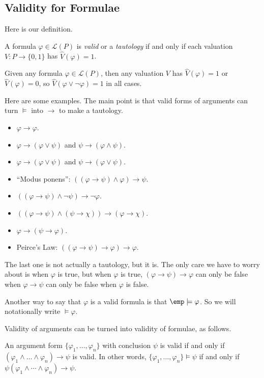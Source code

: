 \subsection{Validity for Formulae}
Here is our definition.
\begin{definition}
	A formula $\varphi\in\mathcal L(P)$ is \textit{valid} or a \textit{tautology} if and only if each valuation $V:P\to\{0,1\}$ has $\hat V(\varphi)=1$.
\end{definition}
\begin{example}
	Given any formula $\varphi\in\mathcal L(P)$, then any valuation $V$ has $\hat V(\varphi)=1$ or $\hat V(\varphi)=0$, so $\hat V(\varphi\lor\lnot\varphi)=1$ in all cases.
\end{example}
Here are some examples. The main point is that valid forms of arguments can turn $\models$ into $\to$ to make a tautology.
\begin{itemize}
	\item $\varphi\to\varphi$.
	\item $\varphi\to(\varphi\lor\psi)$ and $\psi\to(\varphi\land\psi)$.
	\item $\varphi\to(\varphi\lor\psi)$ and $\psi\to(\varphi\lor\psi)$.
	\item ``Modus ponens'': $((\varphi\to\psi)\land\varphi)\to\psi$.
	\item $((\varphi\to\psi)\land\lnot\psi)\to\lnot\varphi$.
	\item $((\varphi\to\psi)\land(\psi\to\chi))\to(\varphi\to\chi)$.
	\item $\varphi\to(\psi\to\varphi)$.
	\item Peirce's Law: $((\varphi\to\psi)\to\varphi)\to\varphi$.
\end{itemize}
The last one is not actually a tautology, but it is. The only care we have to worry about is when $\varphi$ is true, but when $\varphi$ is true, $(\varphi\to\psi)\to\varphi$ can only be false when $\varphi\to\psi$ can only be false when $\varphi$ is false.
\begin{remark}
	Another way to say that $\varphi$ is a valid formula is that $\emp\models\varphi$. So we will notationally write $\models\varphi$.
\end{remark}
Validity of arguments can be turned into validity of formulae, as follows.
\begin{theorem}[Deduction]
	An argument form $\{\varphi_1,\ldots,\varphi_n\}$ with conclusion $\psi$ is valid if and only if $(\varphi_1\land\ldots\land\varphi_n)\to\psi$ is valid. In other words, $\{\varphi_1,\ldots,\varphi_n\}\models\psi$ if and only if $\psi(\varphi_1\land\cdots\land\varphi_n)\to\psi$.
\end{theorem}
